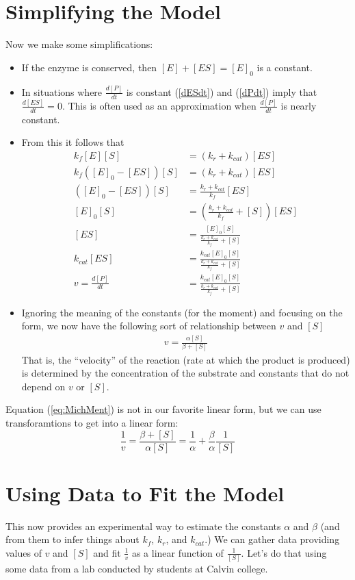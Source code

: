 \documentclass{article}
\begin{document}
\section{Simplifying the Model}
Now we make some simplifications:
\begin{itemize}
	\item
		If the enzyme is conserved, then $[E] + [ES] = [E]_0$ is a constant.
	\item
In situations where $\frac{d[P]}{dt}$ is constant 
(\ref{dESdt}) and (\ref{dPdt}) imply that $\frac{d[ES]}{dt} = 0$.
This is often used as an approximation when $\frac{d[P]}{dt}$ 
is nearly constant.

\item
	From this it follows that 
	\begin{align*}
	k_f [E] [S] & = ( k_r + k_{cat} ) [ES] 
	\\
	k_f ([E]_0 - [ES]) [S] & = ( k_r + k_{cat} ) [ES] 
	\\
	([E]_0 - [ES]) [S] & =  \frac{k_r + k_{cat}}{k_f}  [ES] 
	\\
	[E]_0 [S] & = \left( \frac{k_r + k_{cat}}{k_f} + [S] \right)  [ES] 
	\\
	[ES] & = \frac{ [E]_0 [S] }{ \frac{k_r + k_{cat}}{k_f} + [S] }  
	\\
	k_{cat} [ES] & = \frac{k_{cat} [E]_0 [S]}{ \frac{k_r + k_{cat}}{k_f} + [S]}  
	\\
	v = \frac{d[P]}{dt}& = \frac{k_{cat} [E]_0 [S]}{\frac{k_r + k_{cat}}{k_f} + [S]}  
	\end{align*}
\item
	Ignoring the meaning of the constants (for the moment) 
	and focusing on the form, we now have 
	the following sort of relationship between $v$ and $[S]$
	\begin{align}
	v = \frac{ \alpha [S] }{ \beta + [S] }
	\label{eq:MichMent}
\end{align}
    That is, the ``velocity'' of the reaction (rate at which the product is produced)
	is determined by the concentration of the substrate and constants that do 
	not depend on $v$ or $[S]$.
\end{itemize}

Equation (\ref{eq:MichMent}) is not in our favorite linear form, but we can
use transforamtions to get into a linear form:
\[
\frac{1}v
= \frac {\beta + [S] }{ \alpha [S] } 
= \frac{1}{\alpha} + \frac{\beta}{\alpha} \frac{1}{[S]} 
\]

\section{Using Data to Fit the Model}
This now provides an experimental way to estimate the constants $\alpha$ and
$\beta$ (and from them to infer things about $k_{f}$, $k_r$, and $k_{cat}$.) We
can gather data providing values of $v$ and $[S]$ and fit $\frac{1}{v}$ as a 
linear function of $\frac{1}{[S]}$.
Let's do that using some data from a lab conducted by students at Calvin
college.
\end{document}
